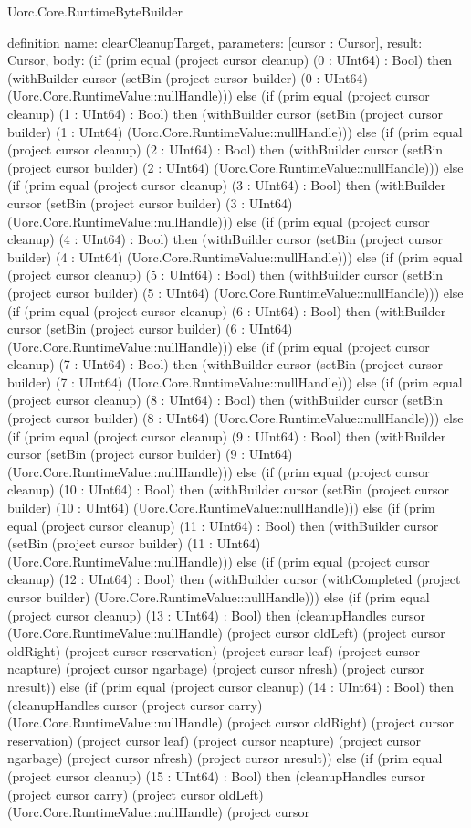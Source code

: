\begin{lexlean}{Uorc.Core.RuntimeByteBuilder}
\begin{semanticmodule}
definition{
  name: clearCleanupTarget,
  parameters: [cursor : Cursor],
  result: Cursor,
  body: (if (prim equal (project cursor cleanup) (0 : UInt64) : Bool) then (withBuilder cursor (setBin (project cursor builder) (0 : UInt64) (Uorc.Core.RuntimeValue::nullHandle))) else (if (prim equal (project cursor cleanup) (1 : UInt64) : Bool) then (withBuilder cursor (setBin (project cursor builder) (1 : UInt64) (Uorc.Core.RuntimeValue::nullHandle))) else (if (prim equal (project cursor cleanup) (2 : UInt64) : Bool) then (withBuilder cursor (setBin (project cursor builder) (2 : UInt64) (Uorc.Core.RuntimeValue::nullHandle))) else (if (prim equal (project cursor cleanup) (3 : UInt64) : Bool) then (withBuilder cursor (setBin (project cursor builder) (3 : UInt64) (Uorc.Core.RuntimeValue::nullHandle))) else (if (prim equal (project cursor cleanup) (4 : UInt64) : Bool) then (withBuilder cursor (setBin (project cursor builder) (4 : UInt64) (Uorc.Core.RuntimeValue::nullHandle))) else (if (prim equal (project cursor cleanup) (5 : UInt64) : Bool) then (withBuilder cursor (setBin (project cursor builder) (5 : UInt64) (Uorc.Core.RuntimeValue::nullHandle))) else (if (prim equal (project cursor cleanup) (6 : UInt64) : Bool) then (withBuilder cursor (setBin (project cursor builder) (6 : UInt64) (Uorc.Core.RuntimeValue::nullHandle))) else (if (prim equal (project cursor cleanup) (7 : UInt64) : Bool) then (withBuilder cursor (setBin (project cursor builder) (7 : UInt64) (Uorc.Core.RuntimeValue::nullHandle))) else (if (prim equal (project cursor cleanup) (8 : UInt64) : Bool) then (withBuilder cursor (setBin (project cursor builder) (8 : UInt64) (Uorc.Core.RuntimeValue::nullHandle))) else (if (prim equal (project cursor cleanup) (9 : UInt64) : Bool) then (withBuilder cursor (setBin (project cursor builder) (9 : UInt64) (Uorc.Core.RuntimeValue::nullHandle))) else (if (prim equal (project cursor cleanup) (10 : UInt64) : Bool) then (withBuilder cursor (setBin (project cursor builder) (10 : UInt64) (Uorc.Core.RuntimeValue::nullHandle))) else (if (prim equal (project cursor cleanup) (11 : UInt64) : Bool) then (withBuilder cursor (setBin (project cursor builder) (11 : UInt64) (Uorc.Core.RuntimeValue::nullHandle))) else (if (prim equal (project cursor cleanup) (12 : UInt64) : Bool) then (withBuilder cursor (withCompleted (project cursor builder) (Uorc.Core.RuntimeValue::nullHandle))) else (if (prim equal (project cursor cleanup) (13 : UInt64) : Bool) then (cleanupHandles cursor (Uorc.Core.RuntimeValue::nullHandle) (project cursor oldLeft) (project cursor oldRight) (project cursor reservation) (project cursor leaf) (project cursor ncapture) (project cursor ngarbage) (project cursor nfresh) (project cursor nresult)) else (if (prim equal (project cursor cleanup) (14 : UInt64) : Bool) then (cleanupHandles cursor (project cursor carry) (Uorc.Core.RuntimeValue::nullHandle) (project cursor oldRight) (project cursor reservation) (project cursor leaf) (project cursor ncapture) (project cursor ngarbage) (project cursor nfresh) (project cursor nresult)) else (if (prim equal (project cursor cleanup) (15 : UInt64) : Bool) then (cleanupHandles cursor (project cursor carry) (project cursor oldLeft) (Uorc.Core.RuntimeValue::nullHandle) (project cursor }
\end{semanticmodule}
\end{lexlean}
